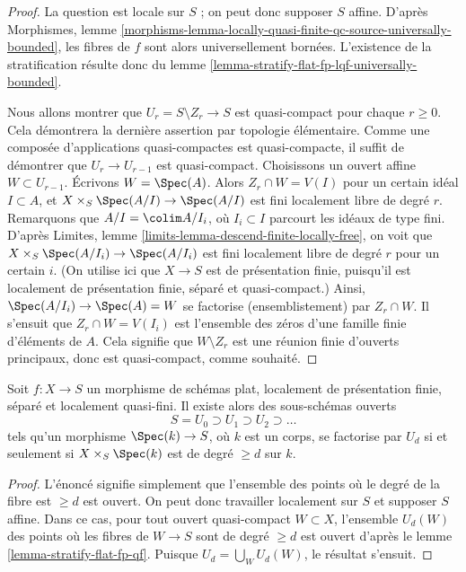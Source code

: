 \begin{proof}
La question est locale sur $S$ ; on peut donc supposer $S$ affine.
D'après Morphismes, lemme
\ref{morphisms-lemma-locally-quasi-finite-qc-source-universally-bounded},
les fibres de $f$ sont alors universellement bornées.
L'existence de la stratification résulte donc du
lemme \ref{lemma-stratify-flat-fp-lqf-universally-bounded}.

\medskip\noindent
Nous allons montrer que $U_r = S \setminus Z_r \to S$ est quasi-compact pour
chaque $r \geq 0$. Cela démontrera la dernière assertion par topologie élémentaire.
Comme une composée d'applications quasi-compactes est quasi-compacte,
il suffit de démontrer que $U_r \to U_{r - 1}$ est quasi-compact.
Choisissons un ouvert affine $W \subset U_{r - 1}$. Écrivons $W = \Spec(A)$.
Alors $Z_r \cap W = V(I)$ pour un certain idéal $I \subset A$,
et $X \times_S \Spec(A/I) \to \Spec(A/I)$ est fini localement
libre de degré $r$. Remarquons que $A/I = \colim A/I_i$, où $I_i \subset I$
parcourt les idéaux de type fini. D'après
Limites, lemme \ref{limits-lemma-descend-finite-locally-free},
on voit que $X \times_S \Spec(A/I_i) \to \Spec(A/I_i)$
est fini localement libre de degré $r$ pour un certain $i$. (On utilise ici
que $X \to S$ est de présentation finie, puisqu'il est localement de présentation
finie, séparé et quasi-compact.)
Ainsi, $\Spec(A/I_i) \to \Spec(A) = W$ se factorise (ensemblistement)
par $Z_r \cap W$. Il s'ensuit que $Z_r \cap W = V(I_i)$ est l'ensemble des zéros
d'une famille finie d'éléments de $A$. Cela signifie que
$W \setminus Z_r$ est une réunion finie d'ouverts principaux, donc est quasi-compact,
comme souhaité.
\end{proof}

\begin{lemma}
\label{lemma-stratify-flat-fp-lqf}
Soit $f : X \to S$ un morphisme de schémas plat, localement de présentation finie,
séparé et localement quasi-fini. Il existe alors
des sous-schémas ouverts
$$
S = U_0 \supset U_1 \supset U_2 \supset \ldots
$$
tels qu'un morphisme $\Spec(k) \to S$, où $k$ est un corps,
se factorise par $U_d$ si et
seulement si $X \times_S \Spec(k)$ est de degré $\geq d$ sur $k$.
\end{lemma}

\begin{proof}
L'énoncé signifie simplement que l'ensemble des points où le degré
de la fibre est $\geq d$ est ouvert. On peut donc travailler localement sur $S$ et
supposer $S$ affine. Dans ce cas, pour tout ouvert quasi-compact $W \subset X$,
l'ensemble $U_d(W)$ des points où les fibres de $W \to S$ sont de
degré $\geq d$ est ouvert d'après le lemme \ref{lemma-stratify-flat-fp-qf}.
Puisque $U_d = \bigcup_W U_d(W)$, le résultat s'ensuit.
\end{proof}

